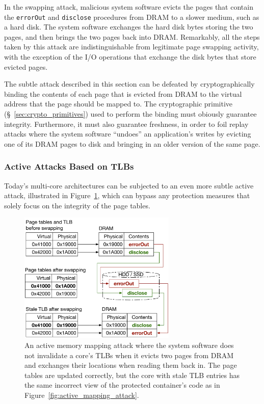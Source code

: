 In the swapping attack, malicious system software evicts the pages that contain
the \texttt{errorOut} and \texttt{disclose} procedures from DRAM to a slower
medium, such as a hard disk. The system software exchanges the hard disk
bytes storing the two pages, and then brings the two pages back into DRAM.
Remarkably, all the steps taken by this attack are indistinguishable from
legitimate page swapping activity, with the exception of the I/O operations
that exchange the disk bytes that store evicted pages.

The subtle attack described in this section can be defeated by
cryptographically binding the contents of each page that is evicted from DRAM
to the virtual address that the page should be mapped to. The cryptographic
primitive (\S~\ref{sec:crypto_primitives}) used to perform the binding must
obiously guarantee integrity. Furthermore, it must also guarantee freshness, in
order to foil replay attacks where the system software ``undoes'' an
application's writes by evicting one of its DRAM pages to disk and bringing in
an older version of the same page.


\subsubsection{Active Attacks Based on TLBs}
\label{sec:tlb_mapping_attacks}

Today's multi-core architectures can be subjected to an even more subtle active
attack, illustrated in Figure~\ref{fig:tlb_mapping_attack}, which can bypass
any protection measures that solely focus on the integrity of the page tables.

\begin{figure}[hbt]
  \centering
  \includegraphics[width=75mm]{figures/tlb_mapping_attack.pdf}
  \caption{
    An active memory mapping attack where the system software does not
    invalidate a core's TLBs when it evicts two pages from DRAM and exchanges
    their locations when reading them back in. The page tables are updated
    correctly, but the core with stale TLB entries has the same incorrect view
    of the protected container's code as in
    Figure~\ref{fig:active_mapping_attack}.
  }
  \label{fig:tlb_mapping_attack}
\end{figure}

